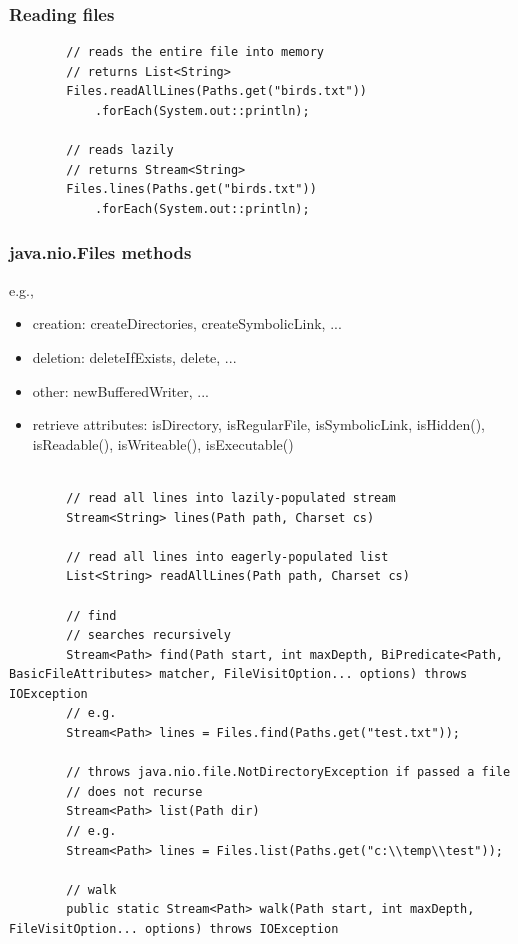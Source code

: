 \documentclass{scrartcl}
\begin{document}
\subsubsection{Reading files}

    \begin{lstlisting}
        // reads the entire file into memory
        // returns List<String>
        Files.readAllLines(Paths.get("birds.txt"))
            .forEach(System.out::println);

        // reads lazily
        // returns Stream<String>
        Files.lines(Paths.get("birds.txt"))
            .forEach(System.out::println);
    \end{lstlisting}

\subsubsection{java.nio.Files methods}

    e.g.,

    \begin{itemize}
        \item creation: createDirectories, createSymbolicLink, ...
        \item deletion: deleteIfExists, delete, ...
        \item other: newBufferedWriter, ...
        \item retrieve attributes: isDirectory, isRegularFile, isSymbolicLink,
            isHidden(), isReadable(), isWriteable(), isExecutable()
    \end{itemize}


    \begin{lstlisting}

        // read all lines into lazily-populated stream
        Stream<String> lines(Path path, Charset cs)

        // read all lines into eagerly-populated list
        List<String> readAllLines(Path path, Charset cs)

        // find
        // searches recursively
        Stream<Path> find(Path start, int maxDepth, BiPredicate<Path, BasicFileAttributes> matcher, FileVisitOption... options) throws IOException
        // e.g.
        Stream<Path> lines = Files.find(Paths.get("test.txt"));

        // throws java.nio.file.NotDirectoryException if passed a file
        // does not recurse
        Stream<Path> list(Path dir)
        // e.g.
        Stream<Path> lines = Files.list(Paths.get("c:\\temp\\test"));

        // walk
        public static Stream<Path> walk(Path start, int maxDepth, FileVisitOption... options) throws IOException
    \end{lstlisting}
\end{document}
